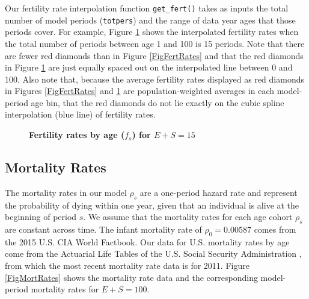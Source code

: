 \documentclass[letterpaper,12pt]{article}
\theoremstyle{definition}
\begin{document}
    Our fertility rate interpolation function \texttt{get\_fert()} takes as inputs the total number of model periods (\texttt{totpers}) and the range of data year ages that those periods cover. For example, Figure \ref{FigFertRates2} shows the interpolated fertility rates when the total number of periods between age 1 and 100 is 15 periods. Note that there are fewer red diamonds than in Figure \ref{FigFertRates} and that the red diamonds in Figure \ref{FigFertRates2} are just equally spaced out on the interpolated line between 0 and 100. Also note that, because the average fertility rates displayed as red diamonds in Figures \ref{FigFertRates} and \ref{FigFertRates2} are population-weighted averages in each model-period age bin, that the red diamonds do not lie exactly on the cubic spline interpolation (blue line) of fertility rates.

    \begin{figure}[htbp]\centering \captionsetup{width=4.0in}
      \caption{\label{FigFertRates2}\textbf{Fertility rates by age ($f_s$) for $E+S=15$}}
    \end{figure}


  \subsection{Mortality Rates}\label{AppPopMort}

    The mortality rates in our model $\rho_s$ are a one-period hazard rate and represent the probability of dying within one year, given that an individual is alive at the beginning of period $s$. We assume that the mortality rates for each age cohort $\rho_s$ are constant across time. The infant mortality rate of $\rho_0=0.00587$ comes from the 2015 U.S. CIA World Factbook. Our data for U.S. mortality rates by age come from the Actuarial Life Tables of the U.S. Social Security Administration \citep[see][]{SocSec:2015}, from which the most recent mortality rate data is for 2011. Figure \ref{FigMortRates} shows the mortality rate data and the corresponding model-period mortality rates for $E+S=100$.
\end{document}
